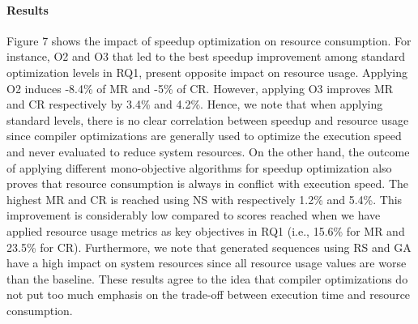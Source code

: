 

\paragraph{Results}

Figure 7 shows the impact of speedup optimization on resource consumption. For instance, O2 and O3 that led to the best speedup improvement among standard optimization levels in RQ1, present opposite impact on resource usage. Applying O2 induces -8.4\% of MR and -5\% of CR. However, applying O3 improves MR and CR respectively by 3.4\% and 4.2\%. Hence, we note that when applying standard levels, there is no clear correlation between speedup and resource usage since compiler optimizations are generally used to optimize the execution speed and never evaluated to reduce system resources.
On the other hand, the outcome of applying different mono-objective algorithms for speedup optimization also proves that resource consumption is always in conflict with execution speed. The highest MR and CR is reached using NS with respectively 1.2\% and 5.4\%. This improvement is considerably low compared to scores reached when we have applied resource usage metrics as key objectives in RQ1 (i.e., 15.6\% for MR and 23.5\% for CR). Furthermore, we note that generated sequences using RS and GA have a high impact on system resources since all resource usage values are worse than the baseline.
These results agree to the idea that compiler optimizations do not put too much emphasis on the trade-off between execution time and resource consumption.

